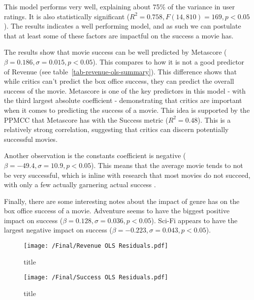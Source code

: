         \begin{multicols}{2}
            This model performs very well, explaining about 75\% of the variance in user
                ratings.
            It is also statistically significant ($R^2=0.758, F(14,810)=169, p<0.05$).
            The results indicates a well performing model, and as such we can postulate
                that at least some of these factors are impactful on the success a movie has.

            The results show that movie success can be well predicted by Metascore
                ($\beta=0.186, \sigma=0.015, p<0.05$).
            This compares to how it is not a good predictor of Revenue (see
                table~\ref{tab-revenue-ols-summary}).
            This difference shows that while critics can't predict the box office success,
                they can predict the overall success of the movie.
            Metascore is one of the key predictors in this model - with the third largest
                absolute coefficient - demonstrating that critics are important when it comes
                to predicting the success of a movie.
            This idea is supported by the PPMCC that Metascore has with the Success metric
                ($R^2=0.48$).
            This is a relatively strong correlation, suggesting that critics can discern
                potentially successful movies.

            Another observation is the constants coefficient is negative
                ($\beta=-49.4,\sigma=10.9,p<0.05$).
            This means that the average movie tends to not be very successful, which is
                inline with research that most movies do not succeed, with only a few actually
                garnering actual success \cite{walls2005modelling}.

            Finally, there are some interesting notes about the impact of genre has on the
                box office success of a movie.
            Adventure seems to have the biggest positive impact on success
                ($\beta=0.128,\sigma=0.036,p<0.05$).
            Sci-Fi appears to have the largest negative impact on success
                ($\beta=-0.223,\sigma=0.043,p<0.05$).

            \begin{figure}[H]
                \texttt{[image: /Final/Revenue OLS Residuals.pdf]}
                \caption[short]{title}\label{fig-revenue-ols-residuals}
            \end{figure}

            \begin{figure}[H]
                \texttt{[image: /Final/Success OLS Residuals.pdf]}
                \caption[short]{title}\label{fig-success-ols-residuals}

            \end{figure}

        \end{multicols}
